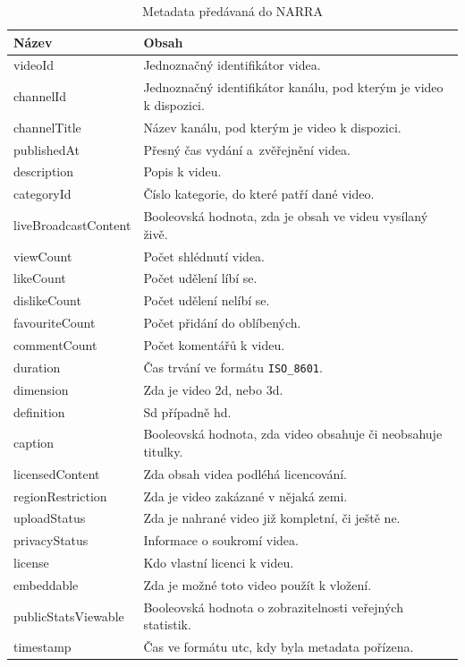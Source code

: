 \begin{table}[!ht]
\centering
\begin{tabular}{| p{} | p{} |}
\hline
	\textbf{Název} & \textbf{Obsah} \\
\hline
\hline
	videoId & Jednoznačný identifikátor videa. \\
\hline
	channelId & Jednoznačný identifikátor kanálu, pod kterým je video k dispozici. \\
\hline
	channelTitle & Název kanálu, pod kterým je video k dispozici. \\
\hline
	publishedAt & Přesný čas vydání a~zvěřejnění videa. \\
\hline
	description & Popis k videu. \\
\hline
	categoryId & Číslo kategorie, do které patří dané video. \\
\hline
	liveBroadcastContent & Booleovská hodnota, zda je obsah ve videu vysílaný živě. \\
\hline
	viewCount & Počet shlédnutí videa. \\
\hline
	likeCount & Počet udělení líbí se. \\
\hline
	dislikeCount & Počet udělení nelíbí se. \\
\hline
	favouriteCount & Počet přidání do oblíbených. \\
\hline
	commentCount & Počet komentářů k videu. \\
\hline
	duration & Čas trvání ve formátu \texttt{ISO\_8601}. \\
\hline
	dimension & Zda je video 2d, nebo 3d. \\
\hline
	definition & Sd případně hd. \\
\hline
	caption & Booleovská hodnota, zda video obsahuje či neobsahuje titulky. \\
\hline
	licensedContent & Zda obsah videa podléhá licencování. \\
\hline
	regionRestriction & Zda je video zakázané v nějaká zemi. \\
\hline
	uploadStatus & Zda je nahrané video již kompletní, či ještě ne. \\
\hline
	privacyStatus & Informace o soukromí videa. \\
\hline
	license & Kdo vlastní licenci k videu. \\
\hline
	embeddable & Zda je možné toto video použít k vložení. \\
\hline
	publicStatsViewable & Booleovská hodnota o zobrazitelnosti veřejných statistik. \\
\hline
	timestamp & Čas ve formátu utc, kdy byla metadata pořízena. \\
\hline
\end{tabular}
\caption[Metadata předávaná do NARRA]{Metadata předávaná do NARRA}\label{tab:bson}
\end{table}

